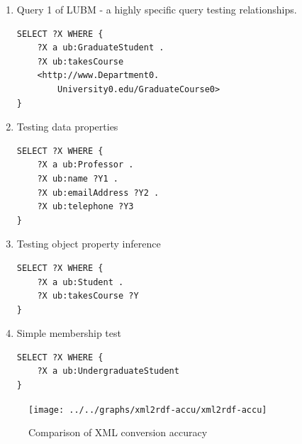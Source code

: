 \documentclass[journal]{IEEEtran}
\begin{document}
\begin{enumerate}
    \item Query 1 of LUBM - a highly specific query testing relationships.
        \begin{verbatim}
SELECT ?X WHERE {
    ?X a ub:GraduateStudent .
    ?X ub:takesCourse
    <http://www.Department0.
        University0.edu/GraduateCourse0>
}
        \end{verbatim}

    \item Testing data properties
        \begin{verbatim}
SELECT ?X WHERE {
    ?X a ub:Professor .
    ?X ub:name ?Y1 .
    ?X ub:emailAddress ?Y2 .
    ?X ub:telephone ?Y3
}
        \end{verbatim}

    \item Testing object property inference
        \begin{verbatim}
SELECT ?X WHERE {
    ?X a ub:Student .
    ?X ub:takesCourse ?Y
}
        \end{verbatim}

    \item Simple membership test
        \begin{verbatim}
SELECT ?X WHERE {
    ?X a ub:UndergraduateStudent
}
        \end{verbatim}
\end{enumerate}

\begin{figure}[h]
    \centering
    \texttt{[image: ../../graphs/xml2rdf-accu/xml2rdf-accu]}
    \caption{Comparison of XML conversion accuracy}
    \label{fig:eval:accu}
\end{figure}
\end{document}
